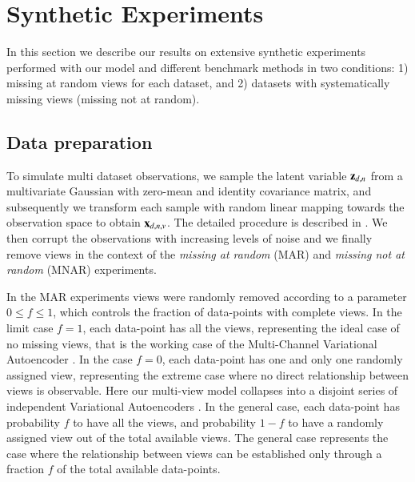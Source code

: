 \section{Synthetic Experiments}
\label{sec:synth}

In this section we describe our results on extensive synthetic experiments performed with our model and different benchmark methods in two conditions:
1) missing at random views for each dataset,
and 2) datasets with systematically missing views (missing not at random).

\subsection{Data preparation}

To simulate multi dataset observations, we sample the latent variable $\mathbf{z}_{d,n}$ from a multivariate Gaussian with zero-mean and identity covariance matrix, and subsequently we transform each sample with random linear mapping towards the observation space to obtain $\mathbf{x}_{d,n,v}$.
The detailed procedure is described in \asupmat.
We then corrupt the observations with increasing levels of noise
and we finally remove views in the context of the \textit{missing at random} (MAR) and \textit{missing not at random} (MNAR) experiments.

In the MAR experiments views were randomly removed according to a parameter $0 \leq f \leq 1$, which controls the fraction of data-points with complete views.
In the limit case $f=1$, each data-point has all the views, representing the ideal case of no missing views, that is the working case of the Multi-Channel Variational Autoencoder \citep{Antelmi2019}.
In the case $f=0$, each data-point has one and only one randomly assigned view, representing the extreme case where no direct relationship between views is observable.
Here our multi-view model collapses into a disjoint series of independent Variational Autoencoders \citep{Kingma2013, Rezende2014}.
In the general case, each data-point has probability $f$ to have all the views, and probability $1-f$ to have a randomly assigned view out of the total available views.
The general case represents the case where the relationship between views can be established only through a fraction $f$ of the total available data-points.

